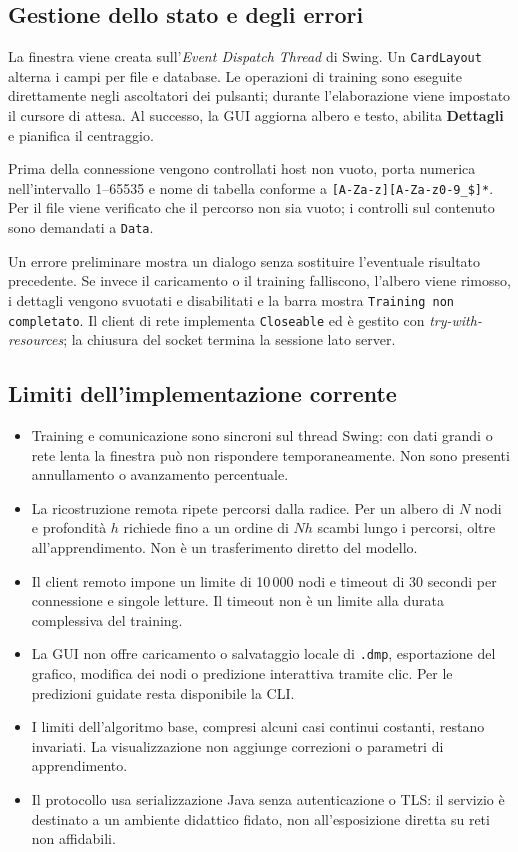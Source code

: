 \clearpage
\subsection*{Gestione dello stato e degli errori}

La finestra viene creata sull'\emph{Event Dispatch Thread} di Swing.
Un \texttt{CardLayout} alterna i campi per file e database. Le operazioni di
training sono eseguite direttamente negli ascoltatori dei pulsanti; durante
l'elaborazione viene impostato il cursore di attesa. Al successo, la GUI
aggiorna albero e testo, abilita \textbf{Dettagli} e pianifica il centraggio.

Prima della connessione vengono controllati host non vuoto, porta numerica
nell'intervallo 1--65535 e nome di tabella conforme a
\verb|[A-Za-z][A-Za-z0-9_$]*|. Per il file viene verificato che il percorso non
sia vuoto; i controlli sul contenuto sono demandati a \texttt{Data}.

Un errore preliminare mostra un dialogo senza sostituire l'eventuale risultato
precedente. Se invece il caricamento o il training falliscono, l'albero viene
rimosso, i dettagli vengono svuotati e disabilitati e la barra mostra
\texttt{Training non completato}. Il client di rete implementa
\texttt{Closeable} ed è gestito con \emph{try-with-resources}; la chiusura del
socket termina la sessione lato server.

\subsection*{Limiti dell'implementazione corrente}

\begin{itemize}
  \item Training e comunicazione sono sincroni sul thread Swing: con dati
        grandi o rete lenta la finestra può non rispondere temporaneamente.
        Non sono presenti annullamento o avanzamento percentuale.
  \item La ricostruzione remota ripete percorsi dalla radice. Per un albero
        di $N$ nodi e profondità $h$ richiede fino a un ordine di $N h$ scambi
        lungo i percorsi, oltre all'apprendimento. Non è un trasferimento
        diretto del modello.
  \item Il client remoto impone un limite di 10\,000 nodi e timeout di
        30 secondi per connessione e singole letture. Il timeout non è un
        limite alla durata complessiva del training.
  \item La GUI non offre caricamento o salvataggio locale di \texttt{.dmp},
        esportazione del grafico, modifica dei nodi o predizione interattiva
        tramite clic. Per le predizioni guidate resta disponibile la CLI.
  \item I limiti dell'algoritmo base, compresi alcuni casi continui costanti,
        restano invariati. La visualizzazione non aggiunge correzioni o
        parametri di apprendimento.
  \item Il protocollo usa serializzazione Java senza autenticazione o TLS:
        il servizio è destinato a un ambiente didattico fidato, non
        all'esposizione diretta su reti non affidabili.
\end{itemize}


